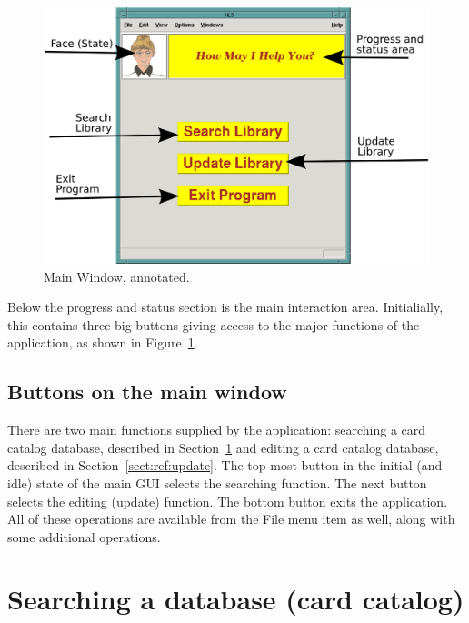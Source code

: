 \begin{figure}[hpt]
\begin{centering}
\includegraphics[width=5in]{MainWindowAnnotated.png}
\caption{Main Window, annotated.}
\label{fig:ref:mainwindowAnno}
\end{centering}
\end{figure}
Below the progress and status section is the main interaction area.
Initialially, this contains three big buttons giving access to the major
functions of the application, as shown in
Figure~\ref{fig:ref:mainwindowAnno}. 

\subsection{Buttons on the main window}

There are two main functions supplied by the application: searching a
card catalog database, described in Section~\ref{sect:ref:search} and
editing a card catalog database, described in
Section~\ref{sect:ref:update}. The top most button in the initial (and
idle) state of the main GUI selects the searching function. The next
button selects the editing (update) function. The bottom button exits
the application. All of these operations are available from the File
menu item as well, along with some additional operations.

\section{Searching a database (card catalog)}
\label{sect:ref:search}

